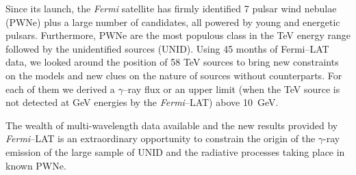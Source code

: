 Since its launch, the \emph{Fermi} satellite has firmly identified 7 pulsar wind nebulae (PWNe) plus a large number of candidates, all powered by young and energetic pulsars. Furthermore, PWNe are the most populous class in the TeV energy range followed by the unidentified sources (UNID). Using 45 months of Fermi--LAT data, we looked around the position of 58 TeV sources to bring new constraints on the models and new clues on the nature of sources without counterparts. For each of them we derived a $\gamma$--ray flux or an upper limit (when the TeV source is not detected at GeV energies by the \emph{Fermi}--LAT) above 10~GeV.

The wealth of multi-wavelength data available and the new results provided by \emph{Fermi}--LAT is an extraordinary opportunity to constrain the origin of the $\gamma$-ray emission of the large sample of UNID and the radiative processes taking place in known PWNe. 